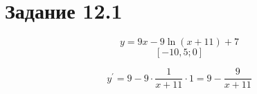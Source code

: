 \section*{Задание 12.1}

\[y=9x-9 \ln(x+11)+7\]
\[[-10,5;0]\]

\[ y^\prime = 9 - 9\cdot\frac{1}{x+11}\cdot1 = 9 - \frac{9}{x+11}\]
